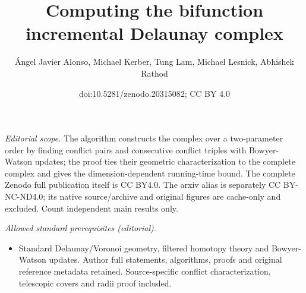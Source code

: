 \documentclass[11pt]{amsart}
\title{Computing the bifunction incremental Delaunay complex}
\author{Ángel Javier Alonso, Michael Kerber, Tung Lam, Michael Lesnick, Abhishek Rathod}
\date{doi:10.5281/zenodo.20315082; CC BY 4.0}
\theoremstyle{plain}
\theoremstyle{definition}
\theoremstyle{remark}
\begin{document}
\maketitle
\noindent\textit{Editorial scope.} The algorithm constructs the complex over a two-parameter order by finding conflict pairs and consecutive conflict triples with Bowyer-Watson updates; the proof ties their geometric characterization to the complete complex and gives the dimension-dependent running-time bound. The complete Zenodo full publication itself is CC BY4.0. The arxiv alias is separately CC BY-NC-ND4.0; its native source/archive and original figures are cache-only and excluded. Count independent main results only.\par\medskip
\noindent\textit{Allowed standard prerequisites (editorial).}\begin{itemize}
\item Standard Delaunay/Voronoi geometry, filtered homotopy theory and Bowyer-Watson updates. Author full statements, algorithms, proofs and original reference metadata retained. Source-specific conflict characterization, telescopic covers and radii proof included.
\end{itemize}\medskip
\end{document}
